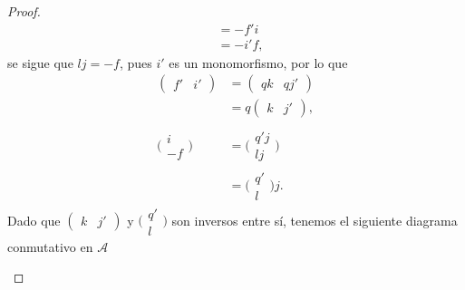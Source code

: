 \documentclass[tesis]{subfiles}
\begin{document}
\begin{proof}
\begin{align*}
             &= -f'i \\
             &= -i'f,
    \end{align*}
    se sigue que $lj=-f$, pues $i'$ es un monomorfismo, por lo que
    \begin{align*}
        (\begin{smallmatrix} f' &i' \end{smallmatrix}) &= (\begin{smallmatrix} qk &qj' \end{smallmatrix}) \\
                                &= q(\begin{smallmatrix} k &j' \end{smallmatrix}), \\ \\
        \big( \begin{smallmatrix} i \\ -f \end{smallmatrix}\big) &= \big( \begin{smallmatrix} q'j \\ lj \end{smallmatrix}\big) \\
                                                                 &= \big( \begin{smallmatrix} q' \\ l \end{smallmatrix}\big) j.
    \end{align*}
    Dado que $(\begin{smallmatrix} k &j' \end{smallmatrix})$ y $\big(\begin{smallmatrix} q' \\ l \end{smallmatrix}\big)$ son inversos entre sí, tenemos el siguiente diagrama conmutativo en $\mathscr{A}$
    \begin{center}
\end{center}
\end{proof}
\end{document}
